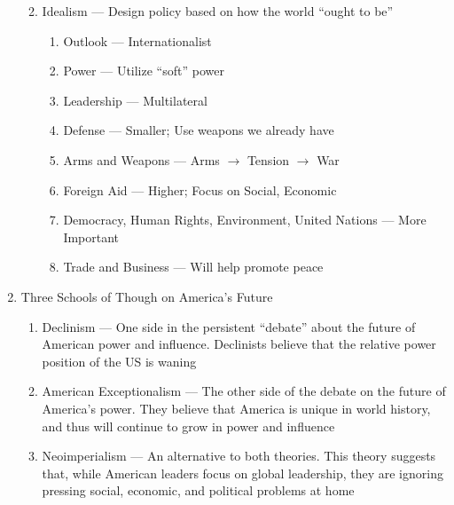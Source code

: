 \documentclass[12pt]{article}
\begin{document}
\begin{enumerate}
\begin{enumerate}
\begin{enumerate}
            \end{enumerate}

          \item Idealism — Design policy based on how the world “ought to be”

            \begin{enumerate}

              \item Outlook — Internationalist

              \item Power — Utilize “soft” power

              \item Leadership — Multilateral

              \item Defense — Smaller; Use weapons we already have

              \item Arms and Weapons — Arms $\rightarrow$ Tension $\rightarrow$ War

              \item Foreign Aid — Higher; Focus on Social, Economic

              \item Democracy, Human Rights, Environment, United Nations — More Important

              \item Trade and Business — Will help promote peace

            \end{enumerate}

        \end{enumerate}

      \item Three Schools of Though on America's Future

        \begin{enumerate}

          \item Declinism — One side in the persistent “debate” about the future of American power and influence. Declinists believe that the relative power position of the US is waning

          \item American Exceptionalism — The other side of the debate on the future of America's power. They believe that America is unique in world history, and thus will continue to grow in power and influence

          \item Neoimperialism — An alternative to both theories. This theory suggests that, while American leaders focus on global leadership, they are ignoring pressing social, economic, and political problems at home


\end{enumerate}
\end{enumerate}
\end{document}
